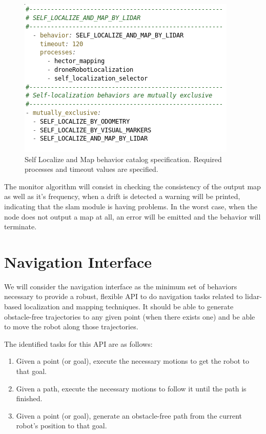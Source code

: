   \begin{figure}
    \centering
    \includegraphics[height=0.25\textheight]{./Figures/BehaviorSlamCatalog.png}
    \caption{Self Localize and Map behavior catalog specification. Required processes and timeout values are specified.}
    \label{ch_4:fig:behav_slam_catalog}
  \end{figure}

  The monitor algorithm will consist in checking the consistency of the output map as well as it's frequency, when a drift is detected a warning will be printed, indicating that the slam module is having problems. In the worst case, when the node does not output a map at all, an error will be emitted and the behavior will terminate.

\section{Navigation Interface} \label{ch_4:sect:nav_interface}

  We will consider the navigation interface as the minimum set of behaviors necessary to provide a robust, flexible API to do navigation tasks related to lidar-based localization and mapping techniques. It should be able to generate obstacle-free trajectories  to any given point (when there exists one) and be able to move the robot along those trajectories.

  The identified tasks for this API are as follows:

  \begin{enumerate}
    \item Given a point (or goal), execute the necessary motions to get the robot to that goal.
    \item Given a path, execute the necessary motions to follow it until the path is finished.
    \item Given a point (or goal), generate an obstacle-free path from the current robot's position to that goal.
  \end{enumerate}

